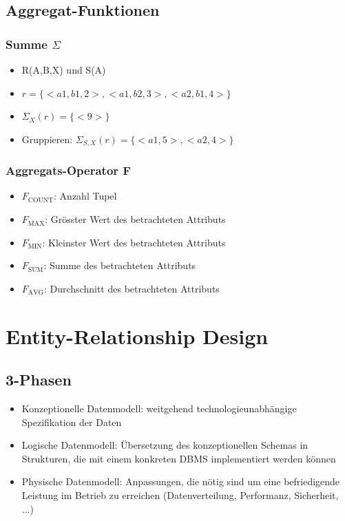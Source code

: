 \documentclass[8pt,a4paper]{scrartcl}
\begin{document}
\begin{multicols*}{3}
				
			\subsection{Aggregat-Funktionen}
				\subsubsection{Summe $\Sigma$}
					\begin{itemize}\itemsep0pt			
						\item R(A,B,X) und S(A)
						\item $r = \{<a1,b1,2>,<a1,b2,3>,<a2,b1,4>\}$
						\item $\Sigma_{X}(r)=\{<9>\} $
						\item Gruppieren: $\Sigma_{S,X}(r)=\{<a1,5>,<a2,4>\} $
					\end{itemize}
					
				\subsubsection{Aggregats-Operator F}
					\begin{itemize}\itemsep0pt			
						\item $F_{\text{COUNT}}$: Anzahl Tupel
						\item $F_{\text{MAX}}$: Grösster Wert des betrachteten Attributs
						\item $F_{\text{MIN}}$: Kleinster Wert des betrachteten Attributs
						\item $F_{\text{SUM}}$: Summe des betrachteten Attributs
						\item $F_{\text{AVG}}$: Durchschnitt des betrachteten Attributs
					\end{itemize}

		\section{Entity-Relationship Design}
			\subsection{3-Phasen}
				\begin{itemize}\itemsep0pt			
					\item Konzeptionelle Datenmodell: weitgehend technologieunabhängige Spezifikation der Daten
					\item Logische Datenmodell: Übersetzung des konzeptionellen Schemas in Strukturen, die mit einem konkreten DBMS implementiert werden können
					\item Physische Datenmodell: Anpassungen, die nötig sind um eine befriedigende Leistung im Betrieb zu erreichen (Datenverteilung, Performanz, Sicherheit, ...)
				\end{itemize}
				

\end{multicols*}
\end{document}
